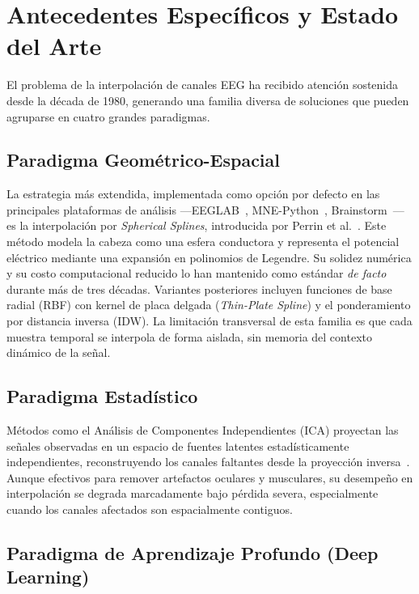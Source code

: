 \section{Antecedentes Específicos y Estado del Arte}

El problema de la interpolación de canales EEG ha recibido atención sostenida desde la década de 1980, generando una familia diversa de soluciones que pueden agruparse en cuatro grandes paradigmas.

\subsection{Paradigma Geométrico-Espacial}

La estrategia más extendida, implementada como opción por defecto en las principales plataformas de análisis —EEGLAB~\cite{delorme2011eeglab}, MNE-Python~\cite{gramfort2013meg}, Brainstorm~\cite{taadel2011brainstorm}— es la interpolación por \textit{Spherical Splines}, introducida por Perrin et al.~\cite{perrin1989}. Este método modela la cabeza como una esfera conductora y representa el potencial eléctrico mediante una expansión en polinomios de Legendre. Su solidez numérica y su costo computacional reducido lo han mantenido como estándar \textit{de facto} durante más de tres décadas. Variantes posteriores incluyen funciones de base radial (RBF) con kernel de placa delgada (\textit{Thin-Plate Spline}) y el ponderamiento por distancia inversa (IDW). La limitación transversal de esta familia es que cada muestra temporal se interpola de forma aislada, sin memoria del contexto dinámico de la señal.

\subsection{Paradigma Estadístico}

Métodos como el Análisis de Componentes Independientes (ICA) proyectan las señales observadas en un espacio de fuentes latentes estadísticamente independientes, reconstruyendo los canales faltantes desde la proyección inversa~\cite{jung2000removing}. Aunque efectivos para remover artefactos oculares y musculares, su desempeño en interpolación se degrada marcadamente bajo pérdida severa, especialmente cuando los canales afectados son espacialmente contiguos.

\subsection{Paradigma de Aprendizaje Profundo (Deep Learning)}

